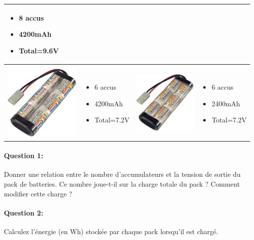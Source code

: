 \begin{tabular}{|m{4cm}|m{3.5cm}|m{4cm}|m{3.5cm}|}
\begin{itemize}
 \item 8 accus  \item 4200mAh \item Total=9.6V  \end{itemize}  \\
\hline
 &  & & \\
 \includegraphics[width=4cm]{img/4200_6} & \begin{itemize}
 \item 6 accus  \item 4200mAh \item Total=7.2V  \end{itemize}  & \includegraphics[width=4cm]{img/2400_6} & \begin{itemize}
 \item 6 accus  \item 2400mAh \item Total=7.2V  \end{itemize}  \\
\hline
\end{tabular}

\paragraph{Question 1:} Donner une relation entre le nombre d'accumulateurs et la tension de sortie du pack de batteries. Ce nombre joue-t-il sur la charge totale du pack ? Comment modifier cette charge ?

\paragraph{Question 2:} Calculez l'énergie (en Wh) stockée par chaque pack lorsqu'il est chargé.

